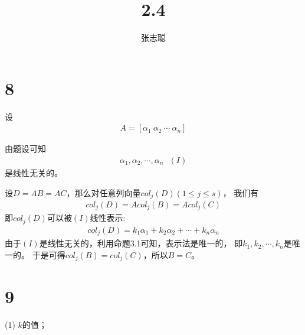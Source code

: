 \documentclass{article}
\begin{document}
\title{2.4}
\author{张志聪}
\maketitle

\section*{8}

设
\begin{align*}
  A = [\alpha_1 \ \alpha_2 \ \cdots \  \alpha_n]
\end{align*}

由题设可知
\begin{align*}
  \alpha_1, \alpha_2, \cdots, \alpha_n \ \ \ (I)
\end{align*}
是线性无关的。

设$D = AB = AC$，那么对任意列向量$col_j(D) (1 \leq j \leq s)$，
我们有
\begin{align*}
  col_j(D) = A col_j(B) = A col_j(C)
\end{align*}
即$col_j(D)$可以被$(I)$线性表示:
\begin{align*}
  col_j(D) = k_1 \alpha_1 + k_2 \alpha_2 + \cdots + k_n \alpha_n
\end{align*}
由于$(I)$是线性无关的，利用命题3.1可知，表示法是唯一的，
即$k_1, k_2, \cdots, k_n$是唯一的。
于是可得$col_j(B) = col_j(C)$，所以$B = C$。

\section*{9}

 (1) $k$的值；
\end{document}
